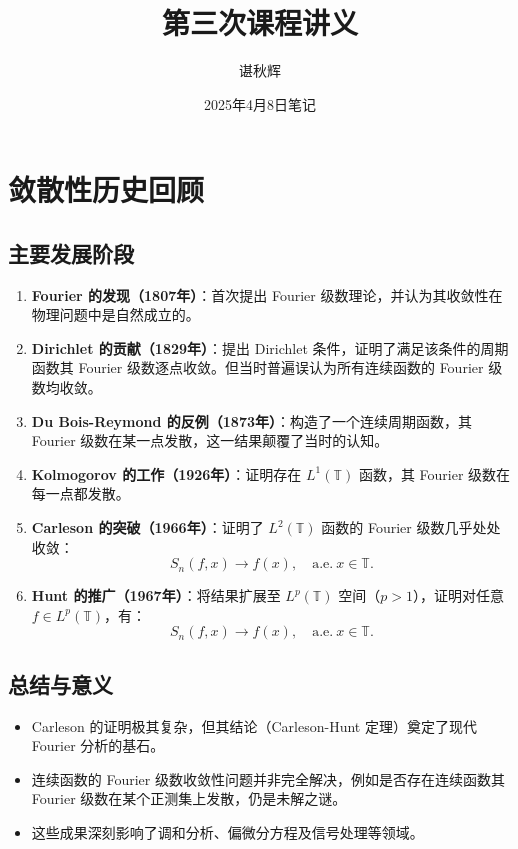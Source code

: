 \documentclass[12pt]{article}
\title{第三次课程讲义}
\author{谌秋辉}
\date{2025年4月8日笔记}
\begin{document}
	
	\maketitle
	
	\section{敛散性历史回顾}
	
	\subsection{主要发展阶段}
	\begin{enumerate}[leftmargin=2cm]
		\item \textbf{Fourier 的发现（1807年）}：首次提出 Fourier 级数理论，并认为其收敛性在物理问题中是自然成立的。
		
		\item \textbf{Dirichlet 的贡献（1829年）}：提出 Dirichlet 条件，证明了满足该条件的周期函数其 Fourier 级数逐点收敛。但当时普遍误认为所有连续函数的 Fourier 级数均收敛。
		
		\item \textbf{Du Bois-Reymond 的反例（1873年）}：构造了一个连续周期函数，其 Fourier 级数在某一点发散，这一结果颠覆了当时的认知。
		
		\item \textbf{Kolmogorov 的工作（1926年）}：证明存在 $L^1(\mathbb{T})$ 函数，其 Fourier 级数在每一点都发散。
		
		\item \textbf{Carleson 的突破（1966年）}：证明了 $L^2(\mathbb{T})$ 函数的 Fourier 级数几乎处处收敛：
		\[
		S_n(f,x) \rightarrow f(x), \quad \text{a.e.} \ x \in \mathbb{T}.
		\]
		
		\item \textbf{Hunt 的推广（1967年）}：将结果扩展至 $L^p(\mathbb{T})$ 空间（$p>1$），证明对任意 $f \in L^p(\mathbb{T})$，有：
		\[
		S_n(f,x) \rightarrow f(x), \quad \text{a.e.} \ x \in \mathbb{T}.
		\]
	\end{enumerate}
	
	\subsection{总结与意义}
	\begin{itemize}
		\item Carleson 的证明极其复杂，但其结论（Carleson-Hunt 定理）奠定了现代 Fourier 分析的基石。
		\item 连续函数的 Fourier 级数收敛性问题并非完全解决，例如是否存在连续函数其 Fourier 级数在某个正测集上发散，仍是未解之谜。
		\item 这些成果深刻影响了调和分析、偏微分方程及信号处理等领域。
	\end{itemize}
	
\end{document}
